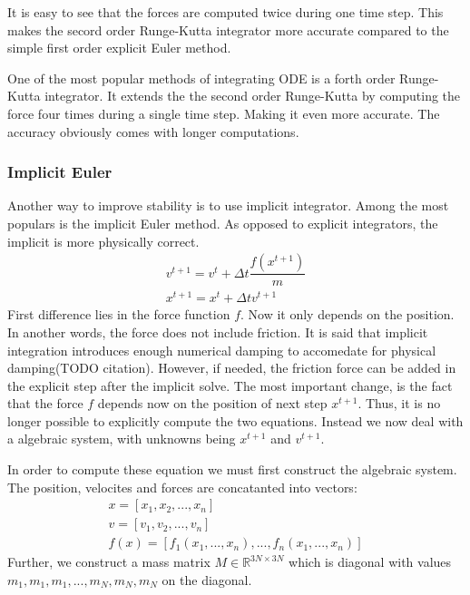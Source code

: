 \documentclass[en]{minipw} %
\begin{document}
It is easy to see that the forces are computed twice during one time step. This makes the secord order Runge-Kutta integrator more accurate compared to the simple first order explicit Euler method.

One of the most popular methods of integrating ODE is a forth order Runge-Kutta integrator. It extends the the second order Runge-Kutta by computing the force four times during a single time step. Making it even more accurate. The accuracy obviously comes with longer computations.

\subsubsection{Implicit Euler}
Another way to improve stability is to use implicit integrator. Among the most populars is the implicit Euler method. As opposed to explicit integrators, the implicit is more physically correct.
\begin{equation}
\label{eq:implicit_euler_ode_v}
\begin{aligned}
v^{t+1} = v^{t} + \Delta t \dfrac{f(x^{t+1})}{m}
\\
x^{t+1} = x^{t} + \Delta t v^{t+1}
\end{aligned}
\end{equation}
First difference lies in the force function $f$. Now it only depends on the position. In another words, the force does not include friction. It is said that implicit integration introduces enough numerical damping to accomedate for physical damping(TODO citation). However, if needed, the friction force can be added in the explicit step after the implicit solve. The most important change, is the fact that the force $f$ depends now on the position of next step $x^{t+1}$. Thus, it is no longer possible to explicitly compute the two equations. Instead we now deal with a algebraic system, with unknowns being $x^{t+1}$ and $v^{t+1}$.

In order to compute these equation we must first construct the algebraic system. The position, velocites and forces are concatanted into vectors:
\begin{equation}
\begin{aligned}
x = [x_1, x_2, ..., x_n]
\\
v = [v_1, v_2, ..., v_n]
\\
f(x) = [f_1(x_1,..., x_n), ..., f_n(x_1,..., x_n)]
\end{aligned}
\end{equation}
Further, we construct a mass matrix $M \in \mathbb{R}^{3N \times 3N}$ which is diagonal with values $m_1, m_1, m_1, ..., m_N, m_N, m_N$ on the diagonal.
\end{document}
